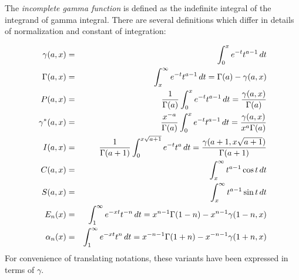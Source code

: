 \documentclass{article}
\begin{document}
The \emph{incomplete gamma function} is defined as the indefinite integral of the integrand of gamma integral.  There are several definitions which differ in details of normalization and constant of integration:

\begin{eqnarray*}
\gamma (a,x) &=& \int_0^x e^{-t} t^{a-1} \, dt \\
\Gamma (a,x) &=&  \int_x^\infty e^{-t} t^{a-1} \, dt = \Gamma(a) - \gamma (a,x) \\
P (a,x) &=& {1 \over \Gamma (a)} \int_0^x e^{-t} t^{a-1} \, dt = {\gamma (a,x) \over \Gamma(a)} \\
\gamma^* (a,x) &=& {x^{-a} \over \Gamma(a)} \int_0^x e^{-t} t^{a-1} \, dt = {\gamma (a,x) \over x^a \Gamma(a)} \\
I (a,x) &=&  {1 \over \Gamma (a+1)} \int_0^{x \sqrt{a+1}} e^{-t} t^a \, dt = {\gamma (a+1, x \sqrt{a+1}) \over  \Gamma(a+1)} \\
C (a,x) &=& \int_x^\infty t^{a-1} \cos t \, dt \\
S (a,x) &=& \int_x^\infty t^{a-1} \sin t \, dt \\
E_n (x) &=& \int_1^\infty e^{-xt} t^{-n} \, dt = x^{n-1} \Gamma (1-n) - x^{n-1} \gamma (1-n,x) \\
\alpha_n (x) &=& \int_1^\infty e^{-xt} t^n \, dt = x^{-n-1} \Gamma (1+n) - x^{-n-1} \gamma (1+n,x) \\
\end{eqnarray*}
For convenience of translating notations, these variants have been expressed in terms of $\gamma$.
\end{document}
